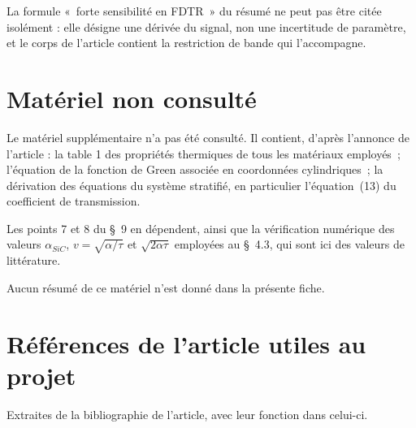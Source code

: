 \documentclass[11pt,a4paper]{article}
\begin{document}
La formule «~forte sensibilité en FDTR~» du résumé ne peut pas être citée isolément : elle
désigne une dérivée du signal, non une incertitude de paramètre, et le corps de l'article
contient la restriction de bande qui l'accompagne.

\section{Matériel non consulté}

Le matériel supplémentaire n'a pas été consulté. Il contient, d'après l'annonce de l'article :
la table 1 des propriétés thermiques de tous les matériaux employés~; l'équation de la fonction
de Green associée en coordonnées cylindriques~; la dérivation des équations du système
stratifié, en particulier l'équation~(13) du coefficient de transmission.

Les points 7 et 8 du §~9 en dépendent, ainsi que la vérification numérique des valeurs
$\alpha_{SiC}$, $v = \sqrt{\alpha/\tau}$ et $\sqrt{2\alpha\tau}$ employées au §~4.3, qui sont
ici des valeurs de littérature.

Aucun résumé de ce matériel n'est donné dans la présente fiche.

\section{Références de l'article utiles au projet}

Extraites de la bibliographie de l'article, avec leur fonction dans celui-ci.
\end{document}
